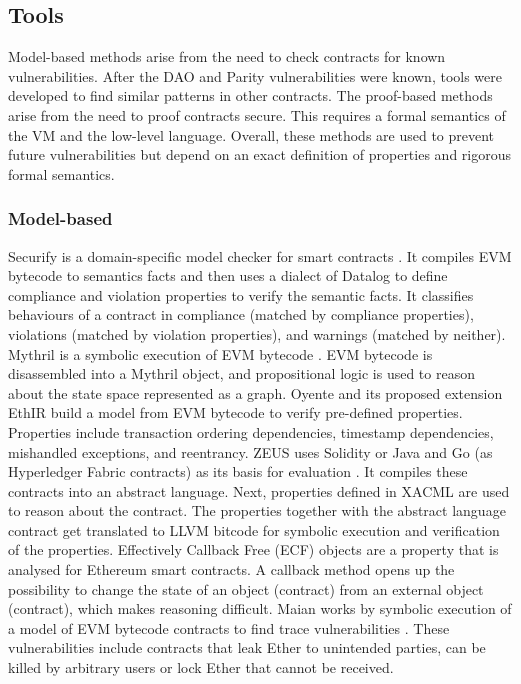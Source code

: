 


\subsection{Tools}
Model-based methods arise from the need to check contracts for known vulnerabilities. After the DAO and Parity vulnerabilities were known, tools were developed to find similar patterns in other contracts. The proof-based methods arise from the need to proof contracts secure. This requires a formal semantics of the VM and the low-level language. Overall, these methods are used to prevent future vulnerabilities but depend on an exact definition of properties and rigorous formal semantics.

\subsubsection{Model-based}
Securify is a domain-specific model checker for smart contracts \cite{Tsankov2017}. It compiles EVM bytecode to semantics facts and then uses a dialect of Datalog to define compliance and violation properties to verify the semantic facts. It classifies behaviours of a contract in compliance (matched by compliance properties), violations (matched by violation properties), and warnings (matched by neither). 
Mythril is a symbolic execution of EVM bytecode \cite{Mueller2018}. EVM bytecode is disassembled into a Mythril object, and propositional logic is used to reason about the state space represented as a graph. 
Oyente \cite{Luu2016} and its proposed extension EthIR \cite{Albert2018} build a model from EVM bytecode to verify pre-defined properties. Properties include transaction ordering dependencies, timestamp dependencies, mishandled exceptions, and reentrancy.
ZEUS uses Solidity or Java and Go (as Hyperledger Fabric contracts) as its basis for evaluation \cite{Kalra2018}. It compiles these contracts into an abstract language. Next, properties defined in XACML are used to reason about the contract. The properties together with the abstract language contract get translated to LLVM bitcode for symbolic execution and verification of the properties.
Effectively Callback Free (ECF) objects are a property that is analysed for Ethereum smart contracts\cite{Grossman2017}. A callback method opens up the possibility to change the state of an object (contract) from an external object (contract), which makes reasoning difficult. 
Maian works by symbolic execution of a model of EVM bytecode contracts to find trace vulnerabilities \cite{Nikolic2018}. These vulnerabilities include contracts that leak Ether to unintended parties, can be killed by arbitrary users or lock Ether that cannot be received. 

